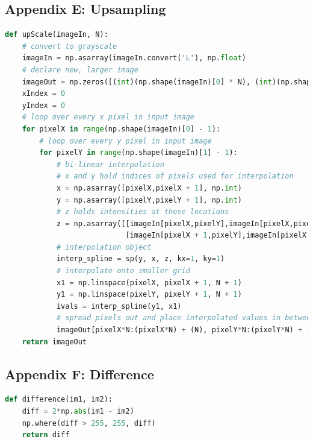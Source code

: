 \documentclass[11pt,a4paper]{article}
\begin{document}
\subsection{Appendix E: Upsampling}
	\begin{lstlisting}[language=Python]
def upScale(imageIn, N):
    # convert to grayscale
    imageIn = np.asarray(imageIn.convert('L'), np.float)
    # declare new, larger image
    imageOut = np.zeros([(int)(np.shape(imageIn)[0] * N), (int)(np.shape(imageIn)[1] * N)])
    xIndex = 0
    yIndex = 0
    # loop over every x pixel in input image
    for pixelX in range(np.shape(imageIn)[0] - 1):
        # loop over every y pixel in input image
        for pixelY in range(np.shape(imageIn)[1] - 1):
            # bi-linear interpolation
            # x and y hold indices of pixels used for interpolation
            x = np.asarray([pixelX,pixelX + 1], np.int)
            y = np.asarray([pixelY,pixelY + 1], np.int)
            # z holds intensities at those locations
            z = np.asarray([[imageIn[pixelX,pixelY],imageIn[pixelX,pixelY + 1]],
                            [imageIn[pixelX + 1,pixelY],imageIn[pixelX + 1,pixelY + 1]]], np.float)
            # interpolation object
            interp_spline = sp(y, x, z, kx=1, ky=1)
            # interpolate onto smaller grid
            x1 = np.linspace(pixelX, pixelX + 1, N + 1)
            y1 = np.linspace(pixelY, pixelY + 1, N + 1)
            ivals = interp_spline(y1, x1)
            # spread pixels out and place interpolated values in between
            imageOut[pixelX*N:(pixelX*N) + (N), pixelY*N:(pixelY*N) + (N)] = ivals[0:N,0:N]
    return imageOut
    \end{lstlisting}
    
\subsection{Appendix F: Difference}
	\begin{lstlisting}[language=Python]
def difference(im1, im2):
    diff = 2*np.abs(im1 - im2)
    np.where(diff > 255, 255, diff)
    return diff
    \end{lstlisting}
    
\pagebreak
	
\end{document}
